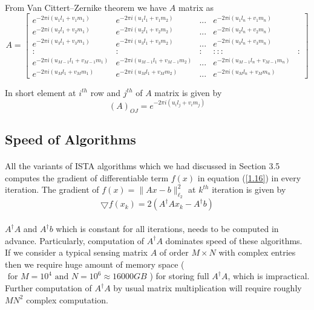 \paragraph{}From Van Cittert–Zernike theorem we have $A$ matrix as
\begin{equation}
 A =
\begin{bmatrix}
      e^{-2 \pi i ( u_1 l_1 + v_1 m_1)} & e^{-2 \pi i ( u_1 l_1 + v_1 m_2)} & ... & e^{-2 \pi i ( u_1 l_n + v_1 m_n)}\\
      e^{-2 \pi i ( u_2 l_1 + v_2 m_1)} & e^{-2 \pi i ( u_2 l_1 + v_2 m_2)} & ... & e^{-2 \pi i ( u_2 l_n + v_2 m_n)}\\
      e^{-2 \pi i ( u_3 l_1 + v_3 m_1)} & e^{-2 \pi i ( u_3 l_1 + v_3 m_2)} & ... & e^{-2 \pi i ( u_3 l_n + v_3 m_n)}\\
      :&:&:&:::&:\\
      e^{-2 \pi i ( u_{M-1} l_1 + v_{M-1} m_1)} & e^{-2 \pi i ( u_{M-1} l_1 + v_{M-1} m_2)} & ... & e^{-2 \pi i ( u_{M-1} l_n + v_{M-1} m_n)}\\
      e^{-2 \pi i ( u_M l_1 + v_M m_1)} & e^{-2 \pi i ( u_M l_1 + v_M m_2)} & ... & e^{-2 \pi i ( u_M l_n + v_M m_n)}
\end{bmatrix}
\label{Amat}
\end{equation}

In short element at $i^{th}$ row and $j^{th}$ of $A$ matrix is given by
\begin{equation}
 (A)_{OJ} = e^{-2 \pi i ( u_i l_j + v_i m_j)}
\end{equation}


\subsection{Speed of Algorithms}
\label{s:algorithms_speed}

\paragraph{}All the variants of ISTA algorithms which we had discussed in Section 3.5 computes
the gradient of differentiable term $f(x)$ in equation (\ref{1.16}) in every iteration. The gradient of
$f(x) = \parallel Ax-b\parallel_{\ell_2}^2$ at $k^{th}$ iteration is given by
\begin{equation}
 \bigtriangledown f(x_k) =  2 (A^\dagger Ax_k- A^\dagger b)
 \label{gradient}
\end{equation}
\paragraph{}$A^\dagger A$ and $A^\dagger b$ which is constant for all iterations, needs to be 
computed in advance. Particularly, computation of $A^\dagger A$ dominates speed of these algorithms. 
If we consider a typical sensing matrix $A$ of order $M \times N$ with complex entries then we require
huge amount of memory space ($\mbox{ for } M = 10^4 \mbox{ and } N = 10^6 \approx 16000 GB$ )
for storing full $A^\dagger A$, which is impractical. Further computation of $A^ \dagger A$ 
by usual matrix multiplication will require roughly $MN^2$ complex computation.

